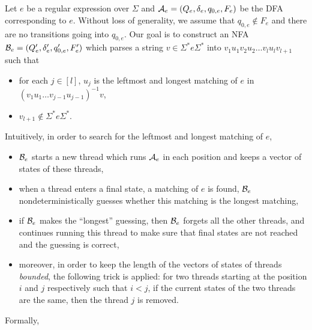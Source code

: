 Let $e$ be a regular expression over $\Sigma$ and $\mathcal{A}_e = (Q_e, \delta_e, q_{0,e}, F_e)$ be the DFA corresponding to $e$. Without loss of generality, we assume that $q_{0, e} \not \in F_e$ and there are no transitions going into $q_{0,e}$.
Our goal is to construct an NFA $\mathcal{B}_e=(Q'_e, \delta'_e, q'_{0,e}, F'_e)$ which parses a string $v \in \Sigma^\ast e \Sigma^\ast$ into $v_1 u_1 v_2 u_2 \dots v_l u_l v_{l+1}$ such that 
\begin{itemize}
	\item for each $j \in [l]$, $u_j$ is the leftmost and longest matching of $e$ in $(v_1 u_1 \dots v_{j-1} u_{j-1})^{-1} v$,
	\item $v_{l+1} \not \in \Sigma^\ast e \Sigma^\ast$.
\end{itemize}
%
Intuitively, in order to search for the leftmost and longest matching of $e$, 
\begin{itemize}
	\item $\mathcal{B}_e$ starts a new thread which runs $\mathcal{A}_e$ in each position and keeps a vector of states of these threads, 
	\item when a thread enters a final state, a matching of $e$ is found, $\mathcal{B}_e$ nondeterministically guesses whether this matching is the longest matching, 
	\item if $\mathcal{B}_e$ makes the ``longest'' guessing, then $\mathcal{B}_e$ forgets all the other threads, and continues running this thread to make sure that final states are not reached and the guessing is correct,
	\item moreover, in order to keep the length of the vectors of states of threads \emph{bounded}, the following trick is applied: for two threads starting at the position $i$ and $j$ respectively such that $i < j$, if the current states of the two threads are the same, then the thread $j$ is removed.
\end{itemize}
%
Formally, 

